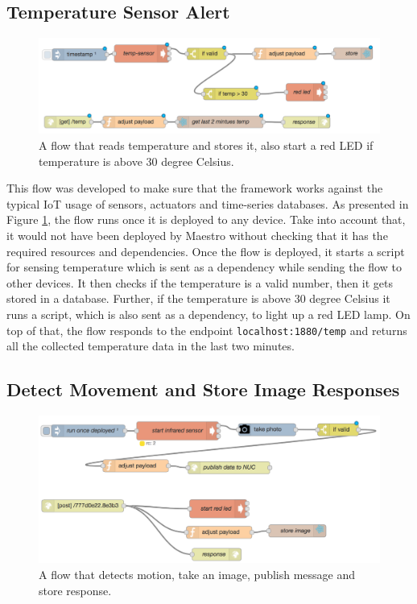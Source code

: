 \subsection{Temperature Sensor Alert}\label{susbec:temp}

 \begin{figure}[H]
	\centering
	\includegraphics[scale=0.6]{images/flow-temp.png}
	\caption{A flow that reads temperature and stores it, also start a red LED if temperature is above 30 degree Celsius.}
	\label{fig:flow-temp}
\end{figure}

This flow was developed to make sure that the  framework works against the typical IoT usage of sensors, actuators and time-series databases. As presented in Figure \ref{fig:flow-temp}, the flow runs once it is deployed to any device. Take into account that, it would not have been deployed by Maestro without checking that it has the required resources and dependencies. Once the flow is deployed, it starts a script for sensing temperature  which is sent as a dependency while sending the flow to other devices. It then checks if the temperature is a valid number, then it gets stored in a database. Further, if the temperature is above 30 degree Celsius it runs a script, which is also sent as a dependency, to light up a red LED lamp. On top of that, the flow responds to the endpoint \verb|localhost:1880/temp| and returns all the collected temperature data in the last two minutes.




\subsection{Detect Movement and Store Image Responses} \label{subsec:detect-move}

\begin{figure}[H]
	\centering
	\includegraphics[scale=0.6]{images/flow-motion.png}
	\caption{A flow that detects motion, take an image, publish message and store response.}
	\label{fig:flow-motion}
\end{figure}


